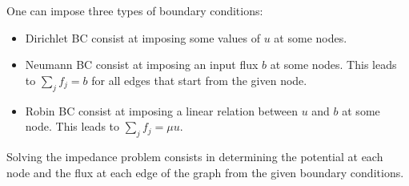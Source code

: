 \documentclass[11pt,a4paper]{article}  %
\begin{document}
One can impose three types of boundary conditions:

\begin{itemize}
   \item Dirichlet BC consist at imposing some values of $u$ at some nodes.
   \item Neumann BC consist at imposing an input flux $b$ at some nodes. This leads to $\sum_j f_j = b$ for all edges that start from the given node.
   \item Robin BC consist at imposing a linear relation between $u$ and $b$ at some node. This leads to $\sum_j f_j = \mu u$.
\end{itemize}


Solving the impedance problem consists in determining the potential at each node and the flux at each edge of the graph from the given boundary conditions.

\end{document}

